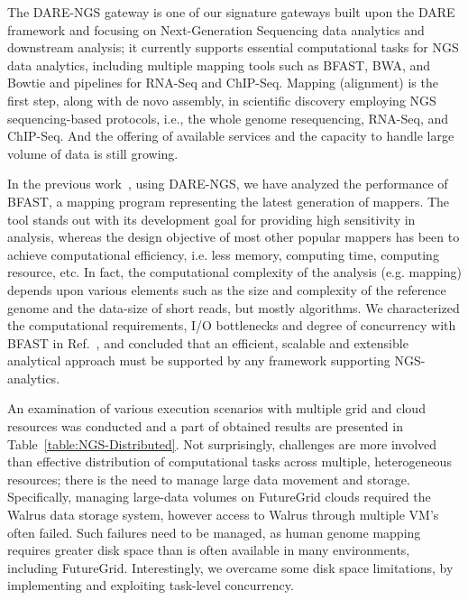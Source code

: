 \documentclass[]{svjour3}
\begin{document}
The DARE-NGS gateway %
is one of our signature gateways built upon the DARE framework and focusing on
Next-Generation Sequencing data analytics and downstream analysis; it
currently supports essential computational tasks for NGS data analytics, including multiple mapping tools such as  BFAST, BWA, and Bowtie and pipelines for RNA-Seq and ChIP-Seq\cite{mardis2008-arghg,ecmls_ccpe10}. Mapping (alignment) is the first step, along with de novo assembly, in scientific discovery employing NGS sequencing-based protocols, i.e., the whole genome resequencing, RNA-Seq, and ChIP-Seq.  And the offering of available services and the capacity to handle large volume of data is still growing.

In the previous work~\cite{dare-ecmls11}, using DARE-NGS, we have analyzed the performance of BFAST, a mapping program representing the latest generation of mappers.  The tool stands out with its development goal for providing high sensitivity in analysis, whereas the design objective of most other popular mappers has been to achieve computational efficiency, i.e. less memory, computing time, computing resource, etc.  In fact, the computational complexity of the analysis (e.g. mapping) depends upon various elements such as the size and complexity of the reference genome and the data-size of short reads, but mostly algorithms.  We characterized the computational requirements, I/O bottlenecks and degree of concurrency with BFAST in Ref.~\cite{dare-ecmls11}, and concluded that an efficient, scalable and extensible analytical approach must be supported by any framework supporting NGS-analytics.

An examination of various execution scenarios with multiple
grid and cloud resources was conducted and a part of obtained results are presented in Table~\ref{table:NGS-Distributed}.  Not surprisingly, challenges are more involved than effective distribution of computational tasks across multiple, heterogeneous
resources; there is the need to manage large data movement and
storage.  Specifically, managing large-data volumes on FutureGrid
clouds required the Walrus data storage system\cite{walrusurl}, however access to Walrus through
multiple VM's often failed.  Such failures need to be managed, as
human genome mapping requires greater disk space than is often
available in many environments, including FutureGrid. Interestingly,
we overcame some disk space limitations, by implementing and
exploiting task-level concurrency.
\end{document}
